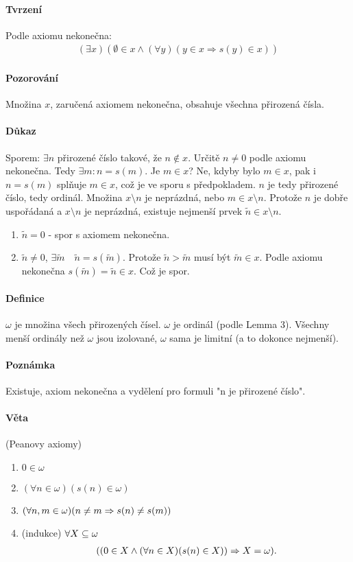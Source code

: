 \documentclass[a4paper,12pt,titlepage]{article}
\begin{document}
\paragraph{Tvrzení}
Podle axiomu nekonečna:
\begin{align}
	(\exists x) ( \emptyset \in x \land (\forall y) ( y \in x \Rightarrow s(y)
	\in x))
\end{align}
\paragraph{Pozorování}
Množina $x$, zaručená axiomem nekonečna, obsahuje všechna přirozená čísla.
\paragraph{Důkaz}
Sporem: $\exists n$ přirozené číslo takové, že $n \nin x$. Určitě $n \neq 0$
podle axiomu nekonečna. Tedy $\exists m: n = s(m)$. Je $m \in x$? Ne, kdyby bylo
$m \in x$, pak i $n = s(m)$ splňuje $m \in x$, což je ve sporu s předpokladem. 
$n$ je tedy přirozené číslo, tedy
ordinál. Množina $x \setminus n$ je neprázdná, nebo $m \in x\setminus n$. 
Protože $n$ je
dobře uspořádaná a $x \setminus n$ je neprázdná, existuje nejmenší prvek $\tilde{n}
\in x \setminus n$. 
\begin{enumerate}
\item $\tilde{n} = 0$ - spor s axiomem nekonečna.
\item $\tilde{n} \neq 0$, $\exists \tilde{m} \quad \tilde{n} = s(\tilde{m})$.
Protože $\tilde{n} > \tilde{m}$ musí být $\tilde{m} \in x$. Podle axiomu nekonečna
$s(\tilde{m}) = \tilde{n} \in x$. Což je spor.
\end{enumerate}
\paragraph{Definice}
$\omega$ je množina všech přirozených čísel. $\omega$ je ordinál (podle Lemma
3). Všechny menší ordinály než $\omega$ jsou izolované, $\omega$ sama je limitní
(a to dokonce nejmenší).
\paragraph{Poznámka}
Existuje, axiom nekonečna a vydělení pro formuli "n je přirozené číslo".
\paragraph{Věta} (Peanovy axiomy)
\begin{enumerate}
	\item $0 \in \omega$
	\item $(\forall n \in \omega )(s(n) \in \omega)$
	\item $(\forall n,m \in \omega)(n \neq m \Rightarrow s(n) \neq s(m))$
	\item (indukce) $\forall X \subseteq \omega$
	\begin{align}
		((0 \in X \land (\forall n \in X)(s(n) \in X))\Rightarrow X = \omega).
	\end{align}
\end{enumerate}
\end{document}
